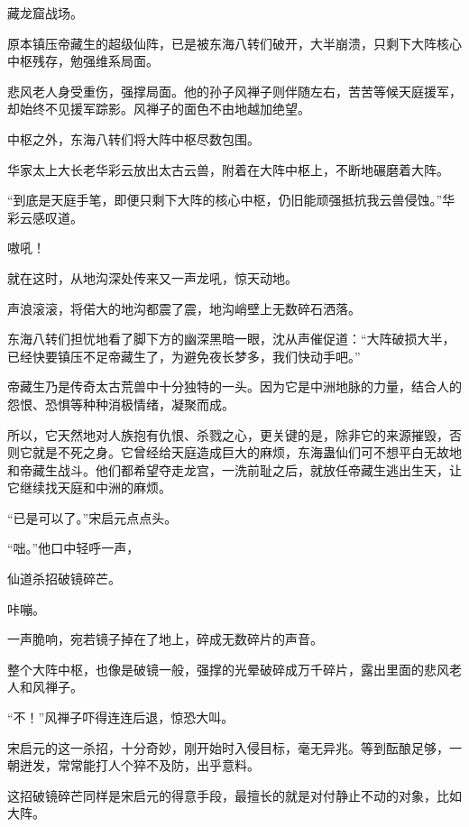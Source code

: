 
\begin{this_body}

藏龙窟战场。

原本镇压帝藏生的超级仙阵，已是被东海八转们破开，大半崩溃，只剩下大阵核心中枢残存，勉强维系局面。

悲风老人身受重伤，强撑局面。他的孙子风禅子则伴随左右，苦苦等候天庭援军，却始终不见援军踪影。风禅子的面色不由地越加绝望。

中枢之外，东海八转们将大阵中枢尽数包围。

华家太上大长老华彩云放出太古云兽，附着在大阵中枢上，不断地碾磨着大阵。

“到底是天庭手笔，即便只剩下大阵的核心中枢，仍旧能顽强抵抗我云兽侵蚀。”华彩云感叹道。

嗷吼！

就在这时，从地沟深处传来又一声龙吼，惊天动地。

声浪滚滚，将偌大的地沟都震了震，地沟峭壁上无数碎石洒落。

东海八转们担忧地看了脚下方的幽深黑暗一眼，沈从声催促道：“大阵破损大半，已经快要镇压不足帝藏生了，为避免夜长梦多，我们快动手吧。”

帝藏生乃是传奇太古荒兽中十分独特的一头。因为它是中洲地脉的力量，结合人的怨恨、恐惧等种种消极情绪，凝聚而成。

所以，它天然地对人族抱有仇恨、杀戮之心，更关键的是，除非它的来源摧毁，否则它就是不死之身。它曾经给天庭造成巨大的麻烦，东海蛊仙们可不想平白无故地和帝藏生战斗。他们都希望夺走龙宫，一洗前耻之后，就放任帝藏生逃出生天，让它继续找天庭和中洲的麻烦。

“已是可以了。”宋启元点点头。

“咄。”他口中轻呼一声，

仙道杀招破镜碎芒。

咔嘣。

一声脆响，宛若镜子掉在了地上，碎成无数碎片的声音。

整个大阵中枢，也像是破镜一般，强撑的光晕破碎成万千碎片，露出里面的悲风老人和风禅子。

“不！”风禅子吓得连连后退，惊恐大叫。

宋启元的这一杀招，十分奇妙，刚开始时入侵目标，毫无异兆。等到酝酿足够，一朝迸发，常常能打人个猝不及防，出乎意料。

这招破镜碎芒同样是宋启元的得意手段，最擅长的就是对付静止不动的对象，比如大阵。


\end{this_body}
